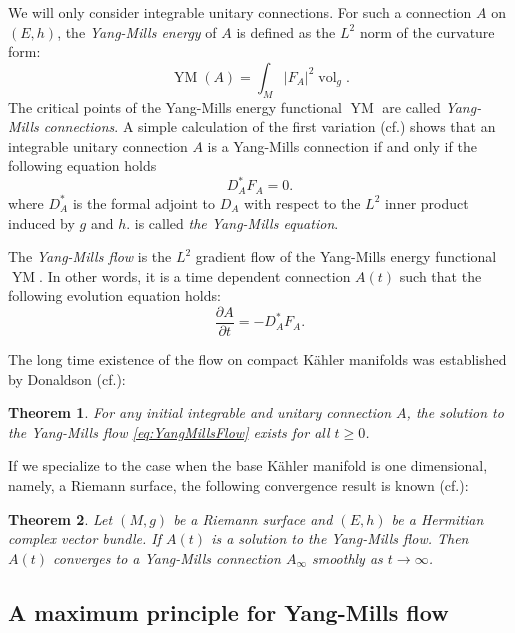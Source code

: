 \documentclass[11pt]{amsart}
\theoremstyle{plain}
\newtheorem{thm}{Theorem}[section]
\theoremstyle{definition}
\numberwithin{equation}{section}
\DeclareMathOperator{\YM}{YM}
\DeclareMathOperator{\vol}{vol}
\begin{document}
We will only consider integrable unitary connections. For such a connection $A$ on $(E,h)$, the \emph{Yang-Mills energy} of $A$ is defined as the $L^2$ norm of the curvature form:
\begin{equation}
    \YM(A)=\int_M|F_A|^2\vol_g.
\end{equation}
The critical points of the Yang-Mills energy functional $\YM$ are called \emph{Yang-Mills connections}. A simple calculation of the first variation (cf.\cite[Theorem 2.21]{BL81}) shows that an integrable unitary connection $A$ is a Yang-Mills connection if and only if the following equation holds
\begin{equation}\label{eq:YangMillsEquation}
    D_A^*F_A=0.
\end{equation}
where $D_A^*$ is the formal adjoint to $D_A$ with respect to the $L^2$ inner product induced by $g$ and $h$.
 is called \emph{the Yang-Mills equation}.

The \emph{Yang-Mills flow} is the $L^2$ gradient flow of the Yang-Mills energy functional $\YM$. In other words, it is a time dependent connection $A(t)$ such that the following evolution equation holds:
\begin{equation}\label{eq:YangMillsFlow}
    \frac{\partial A}{\partial t}=-D_A^*F_A.
\end{equation}

The long time existence of the flow on compact K\"{a}hler manifolds was established by Donaldson (cf.\cite[Proposition 20]{Don85}):

\begin{thm}
    For any initial integrable and unitary connection $A$, the solution to the Yang-Mills flow \ref{eq:YangMillsFlow} exists for all $t\ge 0$.
\end{thm}

If we specialize to the case when the base K\"{a}hler manifold is one dimensional, namely, a Riemann surface, the following convergence result is known (cf.\cite{Rd92,Das92}):

\begin{thm}\label{thm:ConvergenceTheorem}
    Let $(M,g)$ be a Riemann surface and $(E,h)$ be a Hermitian complex vector bundle. If $A(t)$ is a solution to the Yang-Mills flow. Then $A(t)$ converges to a Yang-Mills connection $A_\infty$ smoothly as $t\to\infty$.
\end{thm}

\subsection{A maximum principle for Yang-Mills flow}
\end{document}
